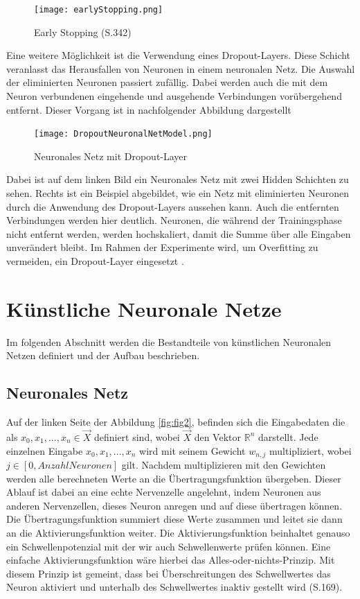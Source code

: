 \documentclass[12pt]{scrreprt}
\begin{document}
\begin{figure}[h!]
	\centering
	\texttt{[image: earlyStopping.png]}
	\caption{Early Stopping \cite{Vogl2021} (S.342)}
	\label{fig:fig23}
\end{figure}

Eine weitere Möglichkeit ist die Verwendung eines Dropout-Layers. Diese Schicht veranlasst das Herausfallen von Neuronen in einem neuronalen Netz. Die Auswahl der eliminierten Neuronen passiert zufällig. Dabei werden auch die mit dem Neuron verbundenen eingehende und ausgehende Verbindungen vorübergehend entfernt. Dieser Vorgang ist in nachfolgender Abbildung dargestellt \cite{Srivastava2014}
\newpage
\begin{figure}[h!]
	\centering
	\texttt{[image: 
		DropoutNeuronalNetModel.png]}
	\caption{Neuronales Netz mit Dropout-Layer \cite{Srivastava2014}}
	\label{fig:fig24}
\end{figure}

Dabei ist auf dem linken Bild ein Neuronales Netz mit zwei Hidden Schichten zu sehen. Rechts ist ein Beispiel abgebildet, wie ein Netz mit eliminierten Neuronen durch die Anwendung des Dropout-Layers aussehen kann. Auch die entfernten Verbindungen werden hier deutlich. Neuronen, die während der Trainingsphase nicht entfernt werden, werden hochskaliert, damit die Summe über alle Eingaben unverändert bleibt. Im Rahmen der Experimente wird, um Overfitting zu vermeiden, ein Dropout-Layer eingesetzt \cite{tensorflow2022}.

\section{Künstliche Neuronale Netze}

Im folgenden Abschnitt werden die Bestandteile von künstlichen Neuronalen Netzen definiert und der Aufbau beschrieben.

\subsection{Neuronales Netz}\label{chapter:NeuronalesNetz}
	
Auf der linken Seite der Abbildung \ref{fig:fig2}, befinden sich die Eingabedaten die als $x_{0}, x_{1}, ..., x_{n} \in{\vec{X}}$  definiert sind, wobei $\vec{X}$ den Vektor $\mathbb{R}^n$ darstellt. Jede einzelnen Eingabe $x_{0}, x_{1},...,x_{n}$ wird mit seinem Gewicht $w_{n,j}$ multipliziert, wobei $j \in{[0,Anzahl Neuronen]}$ gilt. Nachdem multiplizieren mit den Gewichten werden alle berechneten Werte an die Übertragungsfunktion übergeben. Dieser Ablauf ist dabei an eine echte Nervenzelle angelehnt, indem Neuronen aus anderen Nervenzellen, dieses Neuron anregen und auf diese übertragen können. Die Übertragungsfunktion summiert diese Werte zusammen und leitet sie dann an die Aktivierungsfunktion weiter. Die Aktivierungsfunktion beinhaltet genauso ein Schwellenpotenzial mit der wir auch Schwellenwerte prüfen können. Eine einfache Aktivierungsfunktion wäre hierbei das Alles-oder-nichts-Prinzip. Mit diesem Prinzip ist gemeint, dass bei Überschreitungen des Schwellwertes das Neuron aktiviert und unterhalb des Schwellwertes inaktiv gestellt wird \cite{Frochte2021}(S.169).
	
\end{document}
